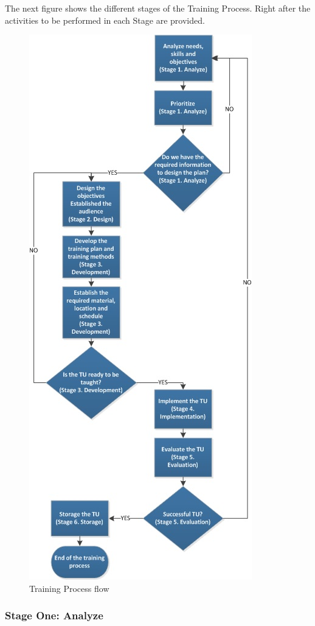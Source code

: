 \documentclass{template/openetcs_article}
\begin{document}
The next figure shows the different stages of the Training Process. Right after the activities to be performed in each Stage are provided. 

\begin{figure}[H]
\centering
\includegraphics{./figures/Training_process.JPG}
\caption{Training Process flow}
\end{figure}


\subsubsection{Stage One: Analyze}
\end{document}
